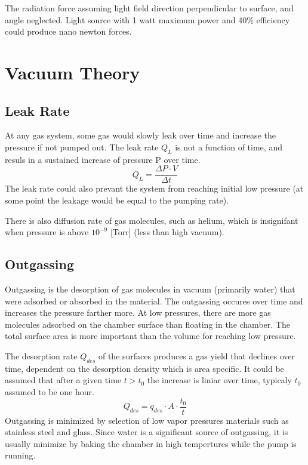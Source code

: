 \documentclass[\main/master.tex]{subfiles}
\begin{document}
The radiation force assuming light field direction perpendicular to surface, and angle neglected. Light source with 1 watt maximum power and 40\% efficiency could produce nano newton forces.  

 

\section{Vacuum Theory}

\subsection{Leak Rate}
At any gas system, some gas would slowly leak over time and increase the pressure if not pumped out. The leak rate $Q_L$ is not a function of time, and resuls in a sustained increase of pressure P over time.
\begin{equation}
Q_L = \frac{\Delta P\cdot V}{\Delta t}  \label{eqn:energy-mass-equivalence-relation}
\end{equation}
The leak rate could also prevant the system from reaching initial low pressure (at some point the leakage would be equal to the pumping rate).
\par
There is also diffusion rate of gas molecules, such as helium, which is insignifant when pressure is above $10^{-9}$ [Torr] (less than high vacuum). 

\subsection{Outgassing}
Outgassing is the desorption of gas molecules in vacuum (primarily water)  that were adsorbed or absorbed in the material. The outgassing occures over time and increases the pressure farther more. At low pressures, there are more gas molecules adsorbed on the chamber surface than floating in the chamber. The total surface area is more important than the volume for reaching low pressure. 
\par
The desorption rate $Q_{des}$ of the surfaces produces a gas yield that declines over time, dependent on the desorption density which is area specific. It could be assumed that after a given time $t>t_0$ the increase is liniar over time, typicaly $t_0$ assumed to be one hour.
\begin{equation}
Q_{des} = q_{des}\cdot A\cdot\frac{t_0}{t}  \label{eqn:energy-mass-equivalence-relation}
\end{equation}
Outgassing is minimized by selection of low vapor pressures materials such as stainless steel and glass. Since water is a significant source of outgassing, it is usually minimize by baking the chamber in high tempertures while the pump is running.
\end{document}
